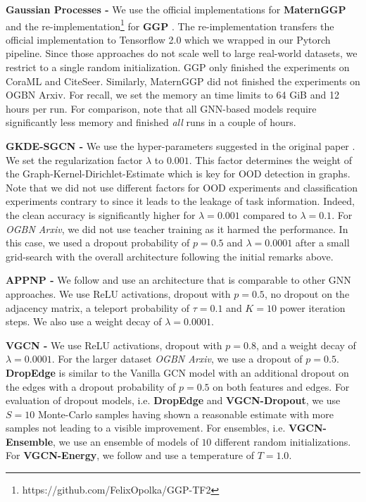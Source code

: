 \textbf{Gaussian Processes - } We use the official implementations for \textbf{MaternGGP} \citep{Borovitskiy2020} and the re-implementation\footnote{https://github.com/FelixOpolka/GGP-TF2} for \textbf{GGP} \citep{Ng2018}. The re-implementation transfers the official implementation to Tensorflow 2.0 \citep{tensorflow} which we wrapped in our Pytorch pipeline. Since those approaches do not scale well to large real-world datasets, we restrict to a single random initialization. GGP only finished the experiments on CoraML and CiteSeer. Similarly, MaternGGP did not finished the experiments on OGBN Arxiv. For recall, we set the memory an time limits to 64 GiB and 12 hours per run. For comparison, note that all GNN-based models require significantly less memory and finished \emph{all} runs in a couple of hours.

\textbf{GKDE-SGCN - } We use the hyper-parameters suggested in the original paper \citep{Zhao2020}. We set the regularization factor $\lambda$ to $0.001$. This factor determines the weight of the Graph-Kernel-Dirichlet-Estimate which is key for OOD detection in graphs. Note that we did not use different factors for OOD experiments and classification experiments contrary to \citep{Zhao2020} since it leads to the leakage of task information. Indeed, the clean accuracy is significantly higher for $\lambda=0.001$ compared to $\lambda=0.1$. For \emph{OGBN Arxiv}, we did not use teacher training as it harmed the performance. In this case, we used a dropout probability of $p=0.5$ and $\lambda = 0.0001$ after a small grid-search with the overall architecture following the initial remarks above.

\textbf{APPNP - } We follow \citep{Klicpera2019} and use an architecture that is comparable to other GNN approaches. We use ReLU activations, dropout with $p=0.5$, no dropout on the adjacency matrix, a teleport probability of $\tau = 0.1$ and $K=10$ power iteration steps. We also use a weight decay of $\lambda = 0.0001$.

\textbf{VGCN - } We use ReLU activations, dropout with $p=0.8$, and a weight decay of $\lambda = 0.0001$. For the larger dataset \emph{OGBN Arxiv}, we use a dropout of $p=0.5$. \textbf{DropEdge} is similar to the Vanilla GCN model with an additional dropout on the edges with a dropout probability of $p=0.5$ on both features and edges. For evaluation of dropout models, i.e. \textbf{DropEdge} and \textbf{VGCN-Dropout}, we use $S = 10$ Monte-Carlo samples having shown a reasonable estimate with more samples not leading to a visible improvement. For ensembles, i.e. \textbf{VGCN-Ensemble}, we use an ensemble of models of $10$ different random initializations. For \textbf{VGCN-Energy}, we follow \citep{Liu2020a} and use a temperature of $T = 1.0$.

